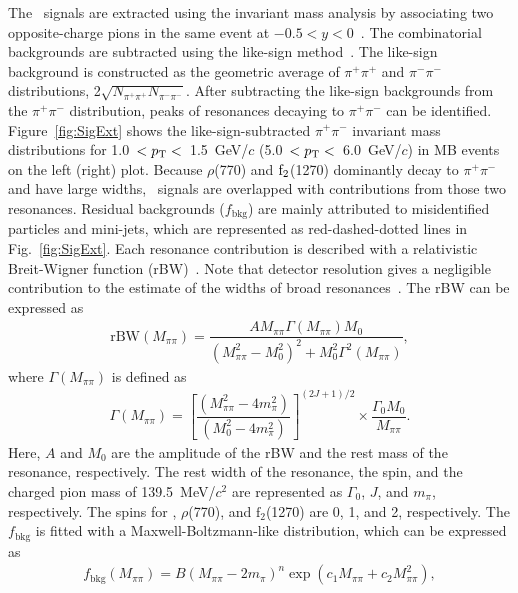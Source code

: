The \fzero~signals are extracted using the invariant mass analysis by associating two opposite-charge pions in the same event at $-0.5<y<0$~\cite{ALICE:2013wgn}. The combinatorial backgrounds are subtracted using the like-sign method~\cite{LIKESIGN}. The like-sign background is constructed as the geometric average of $\pi^{+}\pi^{+}$ and $\pi^{-}\pi^{-}$ distributions,  2$\sqrt{N_{\pi^{+}\pi^{+}}N_{\pi^{-}\pi^{-}}}$. After subtracting the like-sign backgrounds from the $\pi^{+}\pi^{-}$ distribution, peaks of resonances decaying to $\pi^{+}\pi^{-}$ can be identified. Figure~\ref{fig:SigExt} shows the like-sign-subtracted $\pi^{+}\pi^{-}$ invariant mass distributions for 1.0~$<p_{\rm{T}}<$~1.5~GeV/$c$ (5.0~$<p_{\rm{T}}<$~6.0~GeV/$c$) in MB events on the left (right) plot. Because $\rho$(770) and $\rm{f}_{2}$(1270) dominantly decay to $\pi^{+}\pi^{-}$ and have large widths, \fzero~signals are overlapped with contributions from those two resonances. Residual backgrounds ($f_{\mathrm{bkg}}$) are mainly attributed to misidentified particles and mini-jets, which are represented as red-dashed-dotted lines in Fig.~\ref{fig:SigExt}. Each resonance contribution is described with a relativistic Breit-Wigner function (rBW)~\cite{ALICE:2018qdv, ALICE:2022qnb}. Note that detector resolution gives a negligible contribution to the estimate of the widths of broad resonances~\cite{ALICE:2016sak}. The rBW can be expressed as
\begin{eqnarray}
\mathrm{rBW}(M_{\pi\pi}) = \dfrac{AM_{\pi\pi}\Gamma(M_{\pi\pi})M_{0}}{(M_{\pi\pi}^{2}-M_{0}^{2})^{2} + M_{0}^{2}\Gamma^{2}(M_{\pi\pi})},
\label{eq:rBW}
\end{eqnarray}
where $\Gamma(M_{\pi\pi})$ is defined as
\begin{eqnarray}
\Gamma(M_{\pi\pi}) = \left[ \dfrac{ (M_{\pi\pi}^{2} - 4m_{\pi}^{2}) }{ (M_{0}^{2}-4m_{\pi}^{2}) } \right]^{(2J+1)/2} \times \dfrac{\Gamma_{0}M_{0}}{M_{\pi\pi}} .
\label{eq:rBWW}
\end{eqnarray}
Here, $A$ and $M_{0}$ are the amplitude of the rBW and the rest mass of the resonance, respectively. The rest width of the resonance, the spin, and the charged pion mass of 139.5~MeV/$c^{2}$ are represented as $\Gamma_{0}$, $J$, and $m_{\pi}$, respectively. The spins for \fzero, $\rho$(770), and $\mathrm{f}_{2}$(1270) are 0, 1, and 2, respectively. The $f_{\mathrm{bkg}}$ is fitted with a Maxwell-Boltzmann-like distribution, which can be expressed as~\cite{OPAL:1998enc}
\begin{eqnarray}
f_{\mathrm{bkg}}(M_{\pi\pi}) = B(M_{\pi\pi}-2m_{\pi})^{n}\exp{(c_{1}M_{\pi\pi} + c_{2}M_{\pi\pi}^{2})},
\label{eq:bkg}
\end{eqnarray} 
